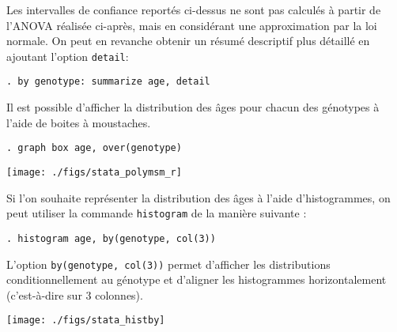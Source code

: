 Les intervalles de confiance reportés ci-dessus ne sont pas calculés à
partir de l'ANOVA réalisée ci-après, mais en considérant une approximation par
la loi normale. On peut en revanche obtenir un résumé descriptif plus
détaillé en ajoutant l'option \texttt{detail}: 
\begin{verbatim}
. by genotype: summarize age, detail
\end{verbatim}

Il est possible d'afficher la distribution des âges pour chacun des
génotypes à l'aide de boites à moustaches.
\begin{verbatim}
. graph box age, over(genotype)
\end{verbatim}

\texttt{[image: ./figs/stata\_polymsm\_r]}

Si l'on souhaite représenter la distribution des âges à l'aide
d'histogrammes, on peut utiliser la commande \texttt{histogram} de la
manière suivante :
\begin{verbatim}
. histogram age, by(genotype, col(3))
\end{verbatim}
L'option \verb|by(genotype, col(3))| permet d'afficher les distributions
conditionnellement au génotype et d'aligner les histogrammes horizontalement
(c'est-à-dire sur 3 colonnes).

\texttt{[image: ./figs/stata\_histby]}

